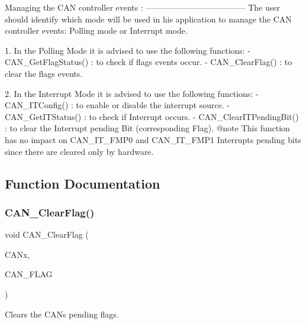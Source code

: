 \begin{DoxyVerb}
  Managing the CAN controller events :
  ------------------------------------ 
  The user should identify which mode will be used in his application to manage 
  the CAN controller events: Polling mode or Interrupt mode.
  
  1.  In the Polling Mode it is advised to use the following functions:
      - CAN_GetFlagStatus() : to check if flags events occur. 
      - CAN_ClearFlag()     : to clear the flags events.
  

  
  2.  In the Interrupt Mode it is advised to use the following functions:
      - CAN_ITConfig()       : to enable or disable the interrupt source.
      - CAN_GetITStatus()    : to check if Interrupt occurs.
      - CAN_ClearITPendingBit() : to clear the Interrupt pending Bit (corresponding Flag).
      @note  This function has no impact on CAN_IT_FMP0 and CAN_IT_FMP1 Interrupts 
             pending bits since there are cleared only by hardware. \end{DoxyVerb}
 

\subsection{Function Documentation}
\mbox{\label{group__CAN__Group6_ga2c01646d5d3a2d7045e8dd71f58f8742}} 
\subsubsection{C\+A\+N\+\_\+\+Clear\+Flag()}
{\footnotesize\ttfamily void C\+A\+N\+\_\+\+Clear\+Flag (\begin{DoxyParamCaption}\item[{\textbf{ C\+A\+N\+\_\+\+Type\+Def} $\ast$}]{C\+A\+Nx,  }\item[{uint32\+\_\+t}]{C\+A\+N\+\_\+\+F\+L\+AG }\end{DoxyParamCaption})}



Clears the C\+AN\textquotesingle{}s pending flags. 


